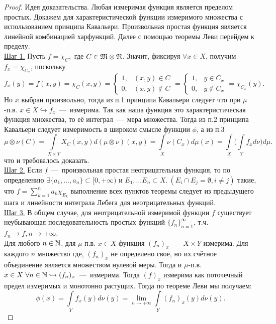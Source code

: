 \begin{proof}
Идея доказательства. Любая измеримая функция является пределом простых. Докажем для характеристической функции измеримого множества с использованием принципа Кавальери. Произвольная простая функция является линейной комбинацией харфункций. Далее с помощью теоремы Леви перейдем к пределу. \\
\underline{Шаг 1.} Пусть $f = \chi_C,$ где $ C \in \mathfrak{M} \otimes \mathfrak{N}$. Значит, фиксируя $\forall x \in X $, получим $ f_x = \chi_{C_x}$, поскольку 
\[f_x(y) = f(x, y) = \chi_C(x, y) = \begin{cases}
    1, & (x, y) \in C \\ 0, & (x, y) \notin C
\end{cases} = \begin{cases}
    1, & y \in C_x \\ 0, & y \notin C_x
\end{cases} = \chi_{C_x}(y).\]
Но $x$ выбран произвольно, тогда из п.1 принципа Кавальери следует что при $\mu$-п.в. $x \in X \hookrightarrow f_x$~---~измерима. Так как наша функция это характеристическая функция множества, то её интеграл~---~мера множества. Тогда из п.2 принципа Кавальери следует измеримость в широком смысле функции $\phi$, а из п.3 \[ \mu \otimes \nu (C) = \int\limits_{X \times Y} X_C(x, y)d(\mu\otimes\nu)(x, y) = \int\limits_X \nu(C_x)d\mu(x) = \int\limits_X\biggl(\int\limits_Y f_xd\nu\biggr)d\mu.\] что и требовалось доказать. \\
\underline{Шаг 2.} Если $f$~---~произвольная простая неотрицательная функция, то по определению $\exists \{a_1, \ldots, a_n\} \subset [0, +\infty)$ и $E_1, \ldots E_n \subset X. \  (E_i \cap E_j = \emptyset, i\neq j)$ такие, что $f = \sum\limits_{k = 1}^n a_k\chi_{E_k}$ выполнение всех пунктов теоремы следует из предыдущего шага и линейности интеграла Лебега для неотрицательных функций. \\
\underline{Шаг 3.} В общем случае, для неотрицательной измеримой функции $f$ существует неубывающая последовательность простых функций $\{f_n\}_{n=1}^{\infty}$, т.ч. $f_n \rightarrow f, n \rightarrow +\infty$.\\
Для любого $n \in \mathbb{N}$, для $\mu$-п.в. $x \in X$ функция $(f_n)_x$~---~$X \times Y$-измерима. Для каждого $n$ множество где, $(f_n)_x$ не определено свое, но их счётное объединение является множеством нулевой меры. Тогда и $\mu$-п.в. $x \in X \ \forall n \in \mathbb{N} \hookrightarrow  (f_n)_x$~---~измерима. Тогда $(f)_x$ измерима как поточечный предел измеримых и монотонно растущих. Тогда по теореме Леви мы получаем: \[\phi(x) = \int\limits_Y f_x(y)d\nu(y) = \lim\limits_{n \rightarrow +\infty} \int\limits_Y (f_n)_x(y) d\nu(y).\]

\end{proof}
